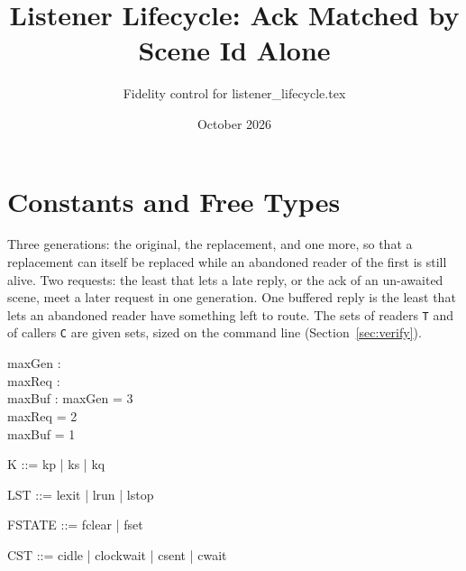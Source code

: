 \documentclass[a4paper,10pt,fleqn]{article}
\begin{document}
\title{Listener Lifecycle: Ack Matched by Scene Id Alone}
\author{Fidelity control for listener\_lifecycle.tex}
\date{October 2026}
\maketitle

\section{Constants and Free Types}

Three generations: the original, the replacement, and one more, so that a
replacement can itself be replaced while an abandoned reader of the first is
still alive.  Two requests: the least that lets a late reply, or the ack of an
un-awaited scene, meet a later request in one generation.  One buffered reply
is the least that lets an abandoned reader have something left to route.  The
sets of readers \texttt{T} and of callers \texttt{C} are given sets, sized on
the command line (Section~\ref{sec:verify}).

\begin{axdef}
  maxGen : \nat \\
  maxReq : \nat \\
  maxBuf : \nat
\where
  maxGen = 3 \\
  maxReq = 2 \\
  maxBuf = 1
\end{axdef}

\begin{zed}
  [T]
\end{zed}

\begin{zed}
  [C]
\end{zed}

\begin{zed}
  K ::= kp | ks | kq
\end{zed}

\begin{zed}
  LST ::= lexit | lrun | lstop
\end{zed}

\begin{zed}
  FSTATE ::= fclear | fset
\end{zed}

\begin{zed}
  CST ::= cidle | clockwait | csent | cwait
\end{zed}

\end{document}
